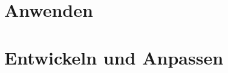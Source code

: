 \documentclass[11pt,twoside,colorback,accentcolor=tud2c,nopartpage,bigchapter,fleqn,ngerman]{tudreport}
\begin{document}


\part{Anwenden}

\clearpage

\FloatBarrier

\clearpage

\FloatBarrier


\part{Entwickeln und Anpassen}

\clearpage

\FloatBarrier

\clearpage

\FloatBarrier

\clearpage

\FloatBarrier

\clearpage

\FloatBarrier

\clearpage

\FloatBarrier






%
\end{document}
